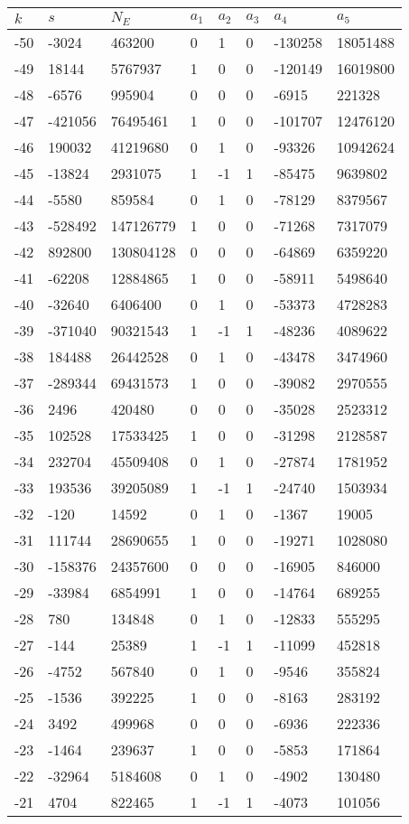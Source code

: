 \documentclass{amsart}
\begin{document}
\begin{longtable}{|l|l|l|lllll|}
\hline
$k$ & $s$ & $N_E$ & $a_1$ & $a_2$ & $a_3$ & $a_4$ & $a_5$\\
\hline
-50&-3024&463200&0&1&0&-130258&18051488\\
-49&18144&5767937&1&0&0&-120149&16019800\\
-48&-6576&995904&0&0&0&-6915&221328\\
-47&-421056&76495461&1&0&0&-101707&12476120\\
-46&190032&41219680&0&1&0&-93326&10942624\\
-45&-13824&2931075&1&-1&1&-85475&9639802\\
-44&-5580&859584&0&1&0&-78129&8379567\\
-43&-528492&147126779&1&0&0&-71268&7317079\\
-42&892800&130804128&0&0&0&-64869&6359220\\
-41&-62208&12884865&1&0&0&-58911&5498640\\
-40&-32640&6406400&0&1&0&-53373&4728283\\
-39&-371040&90321543&1&-1&1&-48236&4089622\\
-38&184488&26442528&0&1&0&-43478&3474960\\
-37&-289344&69431573&1&0&0&-39082&2970555\\
-36&2496&420480&0&0&0&-35028&2523312\\
-35&102528&17533425&1&0&0&-31298&2128587\\
-34&232704&45509408&0&1&0&-27874&1781952\\
-33&193536&39205089&1&-1&1&-24740&1503934\\
-32&-120&14592&0&1&0&-1367&19005\\
-31&111744&28690655&1&0&0&-19271&1028080\\
-30&-158376&24357600&0&0&0&-16905&846000\\
-29&-33984&6854991&1&0&0&-14764&689255\\
-28&780&134848&0&1&0&-12833&555295\\
-27&-144&25389&1&-1&1&-11099&452818\\
-26&-4752&567840&0&1&0&-9546&355824\\
-25&-1536&392225&1&0&0&-8163&283192\\
-24&3492&499968&0&0&0&-6936&222336\\
-23&-1464&239637&1&0&0&-5853&171864\\
-22&-32964&5184608&0&1&0&-4902&130480\\
-21&4704&822465&1&-1&1&-4073&101056\\

\end{longtable}
\end{document}
